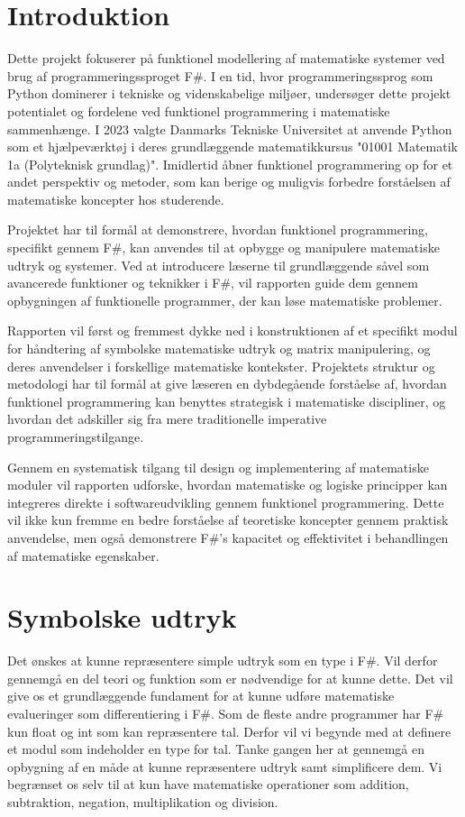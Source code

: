 \documentclass{article}
\begin{document}

\tableofcontents
\newpage

\section{Introduktion} 

Dette projekt fokuserer på funktionel modellering af matematiske systemer ved brug af programmeringssproget F\#. I en tid, hvor programmeringssprog som Python dominerer i tekniske og videnskabelige miljøer, undersøger dette projekt potentialet og fordelene ved funktionel programmering i matematiske sammenhænge. I 2023 valgte Danmarks Tekniske Universitet at anvende Python som et hjælpeværktøj i deres grundlæggende matematikkursus "01001 Matematik 1a (Polyteknisk grundlag)". Imidlertid åbner funktionel programmering op for et andet perspektiv og metoder, som kan berige og muligvis forbedre forståelsen af matematiske koncepter hos studerende.

Projektet har til formål at demonstrere, hvordan funktionel programmering, specifikt gennem F\#, kan anvendes til at opbygge og manipulere matematiske udtryk og systemer. Ved at introducere læserne til grundlæggende såvel som avancerede funktioner og teknikker i F\#, vil rapporten guide dem gennem opbygningen af funktionelle programmer, der kan løse matematiske problemer. 

Rapporten vil først og fremmest dykke ned i konstruktionen af et specifikt modul for håndtering af symbolske matematiske udtryk og matrix manipulering, og deres anvendelser i forskellige matematiske kontekster. Projektets struktur og metodologi har til formål at give læseren en dybdegående forståelse af, hvordan funktionel programmering kan benyttes strategisk i matematiske discipliner, og hvordan det adskiller sig fra mere traditionelle imperative programmeringstilgange.

Gennem en systematisk tilgang til design og implementering af matematiske moduler vil rapporten udforske, hvordan matematiske og logiske principper kan integreres direkte i softwareudvikling gennem funktionel programmering. Dette vil ikke kun fremme en bedre forståelse af teoretiske koncepter gennem praktisk anvendelse, men også demonstrere F\#'s kapacitet og effektivitet i behandlingen af matematiske egenskaber.
 
\newpage


\section{Symbolske udtryk}
Det ønskes at kunne repræsentere simple udtryk som en type i F\#. Vil derfor gennemgå en del teori og funktion som er nødvendige for at kunne dette. Det vil give os et grundlæggende fundament for at kunne udføre matematiske evalueringer som differentiering i F\#. Som de fleste andre programmer har F\# kun float og int som kan repræsentere tal. Derfor vil vi begynde med at definere et modul som indeholder en type for tal. Tanke gangen her at gennemgå en opbygning af en måde at kunne repræsentere udtryk samt simplificere dem. Vi begrænset os selv til at kun have matematiske operationer som addition, subtraktion, negation, multiplikation og division.
\end{document}
